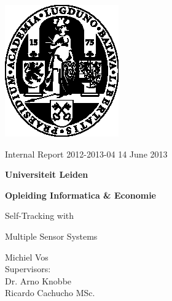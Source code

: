 \documentclass[12pt]{article}
\begin{document}
\thispagestyle{empty}

\begin{large}

\vspace*{4mm}\hspace*{-13mm}\includegraphics{ullogo.eps}

\vspace*{-3.5cm}

\sf 

\hspace*{2.5cm}Internal Report 2012-2013-04 \hspace*{4.5cm} 14 June 2013

\vspace*{5mm}

\begin{Huge}
\hspace*{2.5cm}\textbf{Universiteit Leiden}

\vspace*{8mm}

\hspace*{2.5cm}\textbf{Opleiding Informatica \& Economie}
\end{Huge}

\vspace*{4.5cm}

\begin{Large}
\hfill Self-Tracking with

\vspace*{3mm}

\hfill Multiple Sensor Systems

\vspace*{3mm}


\vspace*{3cm}

\hfill Michiel Vos\\
\hspace*{5cm}\small \hfill Supervisors:\\
\hspace*{5cm}\small \hfill Dr. Arno Knobbe\\
\hspace*{5cm}\small \hfill Ricardo Cachucho MSc.


\end{Large}
\end{large}
\end{document}
